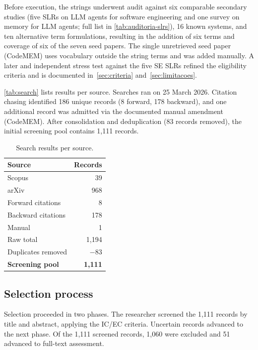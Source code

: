Before execution, the strings underwent audit against six comparable
secondary studies (five SLRs on LLM agents for software engineering and
one survey on memory for LLM agents; full list in
\autoref{tab:auditoria-slrs}), 16 known systems, and ten alternative
term formulations, resulting in the addition of six terms and coverage
of six of the seven seed papers.
The single unretrieved seed paper (CodeMEM) uses vocabulary outside the
string terms and was added manually.
A later and independent stress test against the five SE SLRs refined
the eligibility criteria and is documented in~\autoref{sec:criteria}
and~\autoref{sec:limitacoes}.

\autoref{tab:search} lists results per source.
Searches ran on 25 March 2026.
Citation chasing identified 186 unique records (8 forward, 178 backward),
and one additional record was admitted via the documented manual
amendment (CodeMEM).
After consolidation and deduplication (83 records removed), the initial
screening pool contains 1{,}111 records.

\begin{table}[htbp]
  \centering
  \caption{Search results per source.}
  \label{tab:search}
  \begin{tabular}{l r}
    \toprule
    Source & Records \\
    \midrule
    Scopus              &    39 \\
    arXiv               &   968 \\
    Forward citations   &     8 \\
    Backward citations  &   178 \\
    Manual              &     1 \\
    \midrule
    Raw total           & 1,194 \\
    Duplicates removed  & $-83$ \\
    \textbf{Screening pool} & \textbf{1,111} \\
    \bottomrule
  \end{tabular}
\end{table}

\subsection{Selection process}
\label{sec:selecao}

Selection proceeded in two phases.
The researcher screened the 1{,}111 records by title and abstract,
applying the IC/EC criteria.
Uncertain records advanced to the next phase.
Of the 1{,}111 screened records, 1{,}060 were excluded and 51 advanced to
full-text assessment.

